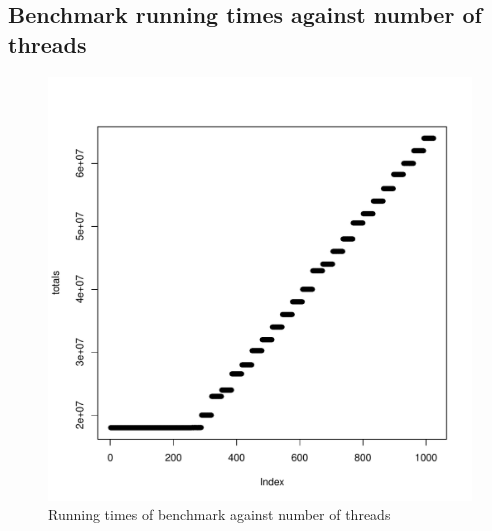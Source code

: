 \documentclass{article}
\begin{document}
	\subsection{Benchmark running times against number of threads}
    \begin{figure}[h]
	    \includegraphics[width=\linewidth]{"graphics/running_times"}
        \caption{Running times of benchmark against number of threads}
    \end{figure}
	\pagebreak
\end{document}
